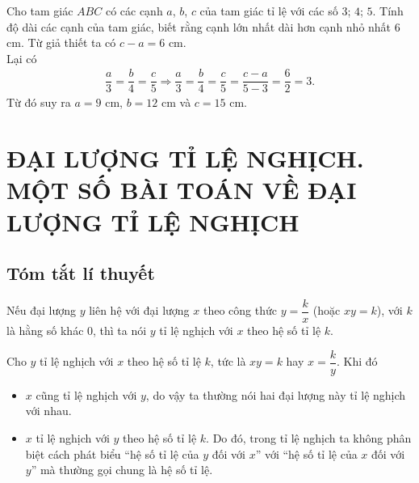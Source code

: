 \begin{bt}%
 Cho tam giác $ABC$ có các cạnh $a$, $b$, $c$ của tam giác tỉ lệ với các số $3$; $4$; $5$. Tính độ dài các cạnh của tam giác, biết rằng cạnh lớn nhất dài hơn cạnh nhỏ nhất $6$ cm.
 \loigiai
  {
  Từ giả thiết ta có $c-a=6$ cm.\\
  Lại có
  \begin{eqnarray*}
   \dfrac{a}{3} = \dfrac{b}{4} = \dfrac{c}{5} \Rightarrow \dfrac{a}{3}=\dfrac{b}{4} = \dfrac{c}{5}=\dfrac{c-a}{5-3}= \dfrac{6}{2} = 3.
  \end{eqnarray*}
  Từ đó suy ra $a=9$ cm, $b=12$ cm và $c=15$ cm.
  }
\end{bt}




\section{ĐẠI LƯỢNG TỈ LỆ NGHỊCH. MỘT SỐ BÀI TOÁN VỀ ĐẠI LƯỢNG TỈ LỆ NGHỊCH}


\subsection{Tóm tắt lí thuyết}

\begin{dn}
 Nếu đại lượng $y$ liên hệ với đại lượng $x$ theo công thức $y=\dfrac{k}{x}$ (hoặc $xy=k$), với $k$ là hằng số khác $0$, thì ta nói $y$ tỉ lệ nghịch với $x$ theo hệ số tỉ lệ $k$.
\end{dn}

\begin{note}
 Cho $y$ tỉ lệ nghịch với $x$ theo hệ số tỉ lệ $k$, tức là $xy=k$ hay $x=\dfrac{k}{y}$. Khi đó
 \begin{itemize}
  \item $x$ cũng tỉ lệ nghịch với $y$, do vậy ta thường nói hai đại lượng này tỉ lệ nghịch với nhau.
  \item $x$ tỉ lệ nghịch với $y$ theo hệ số tỉ lệ $k$. Do đó, trong tỉ lệ nghịch ta không phân biệt cách phát biểu ``hệ số tỉ lệ của $y$ đối với $x$'' với ``hệ số tỉ lệ của $x$ đối với $y$'' mà thường gọi chung là hệ số tỉ lệ.
 \end{itemize}
\end{note}

